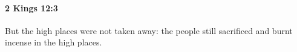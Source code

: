 
		\paragraph{2 Kings 12:3} %
			\label{2KINGS-12-3}

			But the high places were not taken away: the people still sacrificed and burnt incense in the high places.


